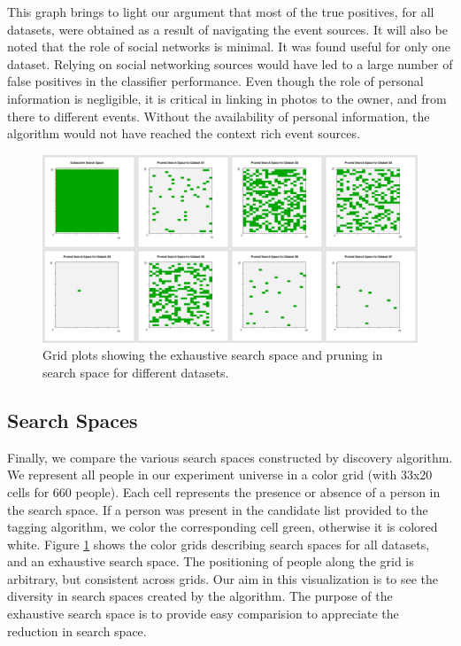 This graph brings to light our argument that most of the true positives, for all datasets, were obtained as a result of navigating the event sources. It will also be noted that the role of social networks is minimal. It was found useful for only one dataset. Relying on social networking sources would have led to a large number of false positives in the classifier performance. Even though the role of personal information is negligible, it is critical in linking in photos to the owner, and from there to different events. Without the availability of personal information, the algorithm would not have reached the context rich event sources.


\begin{figure}[t]
\centering
\includegraphics[width=\textwidth]{diversity/montage-clean-pruned-labelled.png}
\caption{Grid plots showing the exhaustive search space and pruning in search space for different datasets.}
\label{fig:diversity}
\end{figure}

\subsection{Search Spaces}
Finally, we compare the various search spaces constructed by discovery algorithm. We represent all people in our experiment universe in a color grid (with 33x20 cells for 660 people). Each cell represents the presence or absence of a person in the search space. If a person was present in the candidate list provided to the tagging algorithm, we color the corresponding cell green, otherwise it is colored white. Figure \ref{fig:diversity} shows the color grids describing search spaces for all datasets, and an exhaustive search space. The positioning of people along the grid is arbitrary, but consistent across grids. Our aim in this visualization is to see the diversity in search spaces created by the algorithm. The purpose of the exhaustive search space is to provide easy comparision to appreciate the reduction in search space. 

